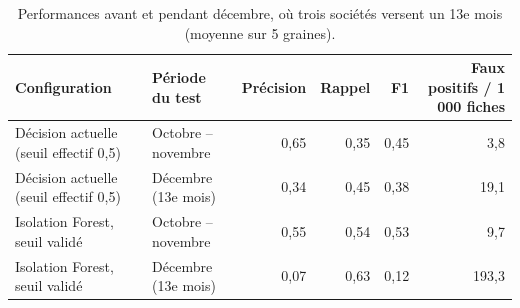 \begin{table}[htbp]
\centering
\caption{Performances avant et pendant décembre, où trois sociétés versent un 13e mois (moyenne sur 5 graines).}
\label{tab:sensibilite_saisonniere}
\small
\begin{tabular}{llrrrr}
\toprule
\textbf{Configuration} & \textbf{Période du test} & \textbf{Précision} & \textbf{Rappel} & \textbf{F1} & \textbf{Faux positifs / 1 000 fiches} \\
\midrule
Décision actuelle (seuil effectif 0,5) & Octobre – novembre & 0,65 & 0,35 & 0,45 & 3,8 \\
Décision actuelle (seuil effectif 0,5) & Décembre (13e mois) & 0,34 & 0,45 & 0,38 & 19,1 \\
Isolation Forest, seuil validé & Octobre – novembre & 0,55 & 0,54 & 0,53 & 9,7 \\
Isolation Forest, seuil validé & Décembre (13e mois) & 0,07 & 0,63 & 0,12 & 193,3 \\
\bottomrule
\end{tabular}
\end{table}
